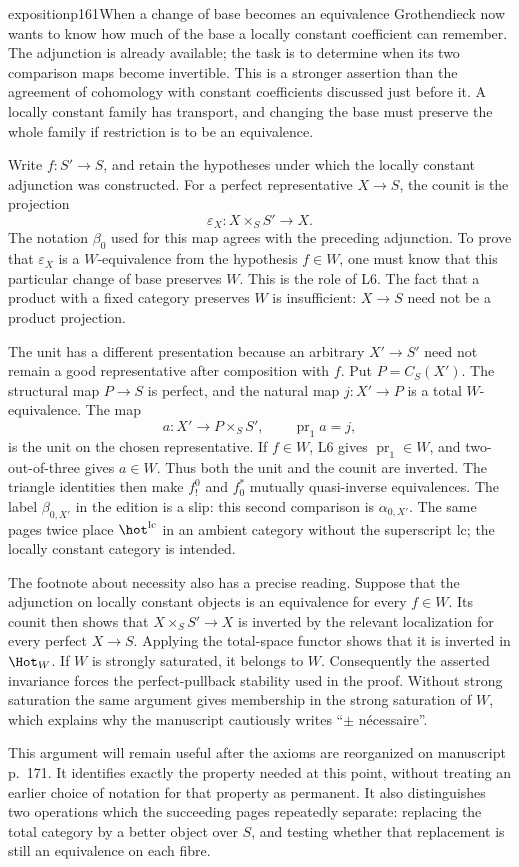 \begin{dcomment}{exposition}{p161}{When a change of base becomes an equivalence}
Grothendieck now wants to know how much of the base a locally constant coefficient can remember. The adjunction is already available; the task is to determine when its two comparison maps become invertible. This is a stronger assertion than the agreement of cohomology with constant coefficients discussed just before it. A locally constant family has transport, and changing the base must preserve the whole family if restriction is to be an equivalence.

Write $f:S'\to S$, and retain the hypotheses under which the locally constant adjunction was constructed. For a perfect representative $X\to S$, the counit is the projection
\[
 \varepsilon_X:X\times_S S'\longrightarrow X.
\]
The notation $\beta_0$ used for this map agrees with the preceding adjunction. To prove that $\varepsilon_X$ is a $W$-equivalence from the hypothesis $f\in W$, one must know that this particular change of base preserves $W$. This is the role of L6. The fact that a product with a fixed category preserves $W$ is insufficient: $X\to S$ need not be a product projection.

The unit has a different presentation because an arbitrary $X'\to S'$ need not remain a good representative after composition with $f$. Put $P=C_S(X')$. The structural map $P\to S$ is perfect, and the natural map $j:X'\to P$ is a total $W$-equivalence. The map
\[
 a:X'\longrightarrow P\times_S S',\qquad
 \operatorname{pr}_1a=j,
\]
is the unit on the chosen representative. If $f\in W$, L6 gives $\operatorname{pr}_1\in W$, and two-out-of-three gives $a\in W$. Thus both the unit and the counit are inverted. The triangle identities then make $f_!^0$ and $f_0^*$ mutually quasi-inverse equivalences. The label $\beta_{0,X'}$ in the edition is a slip: this second comparison is $\alpha_{0,X'}$. The same pages twice place $\hot^{\mathrm{lc}}$ in an ambient category without the superscript $\mathrm{lc}$; the locally constant category is intended.

The footnote about necessity also has a precise reading. Suppose that the adjunction on locally constant objects is an equivalence for every $f\in W$. Its counit then shows that $X\times_S S'\to X$ is inverted by the relevant localization for every perfect $X\to S$. Applying the total-space functor shows that it is inverted in $\Hot_W$. If $W$ is strongly saturated, it belongs to $W$. Consequently the asserted invariance forces the perfect-pullback stability used in the proof. Without strong saturation the same argument gives membership in the strong saturation of $W$, which explains why the manuscript cautiously writes ``$\pm$ n\'ecessaire''.

This argument will remain useful after the axioms are reorganized on manuscript p.~171. It identifies exactly the property needed at this point, without treating an earlier choice of notation for that property as permanent. It also distinguishes two operations which the succeeding pages repeatedly separate: replacing the total category by a better object over $S$, and testing whether that replacement is still an equivalence on each fibre.
\end{dcomment}

